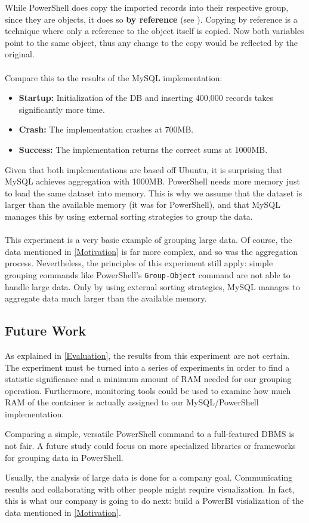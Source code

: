 While \gls{PowerShell} does copy the imported records into their respective group,
since they are objects, it does so \textbf{by reference} (see \cite{psRef}).
Copying by reference is a technique where only a reference to the object
itself is copied. Now both variables point to the same object, thus any change
to the copy would be reflected by the original. \\ \\
Compare this to the results of the \gls{MySQL} implementation:
\begin{itemize}
    \item \textbf{Startup:} Initialization of the DB and inserting 400,000
        records takes significantly more time.
    \item \textbf{Crash:} The implementation crashes at 700MB.
    \item \textbf{Success:} The implementation returns the correct sums at 1000MB.
\end{itemize}
Given that both implementations are based off Ubuntu, it is surprising
that \gls{MySQL} achieves aggregation with 1000MB. \gls{PowerShell} needs more
memory just to load the same dataset into memory. This is why we assume
that the dataset is larger than the available memory (it was for \gls{PowerShell}),
and that \gls{MySQL} manages this by using external sorting strategies to group the data. \\ \\
This experiment is a very basic example of grouping large data. Of course,
the data mentioned in \ref{Motivation} is far more complex, and so was
the aggregation process. Nevertheless, the principles of this experiment still apply:
simple grouping commands like \gls{PowerShell}'s \verb+Group-Object+ command
are not able to handle large data. Only by using external sorting strategies,
\gls{MySQL} manages to aggregate data much larger than the available memory.

\subsection{Future Work}
As explained in \ref{Evaluation}, the results from this experiment are not
certain. The experiment must be turned into a series of experiments in order
to find a statistic significance and a minimum amount of \gls{RAM} needed
for our grouping operation. Furthermore, monitoring tools could be used
to examine how much \gls{RAM} of the container is actually assigned to our
\gls{MySQL}/\gls{PowerShell} implementation.

Comparing a simple, versatile \gls{PowerShell} command to a full-featured \gls{DBMS}
is not fair. A future study could focus on more specialized libraries
or frameworks for grouping data in \gls{PowerShell}.

Usually, the analysis of large data is done for a company goal.
Communicating results and collaborating with other people
might require visualization. In fact, this is what our company is going to
do next: build a \gls{PowerBI} visialization of the data mentioned in \ref{Motivation}.